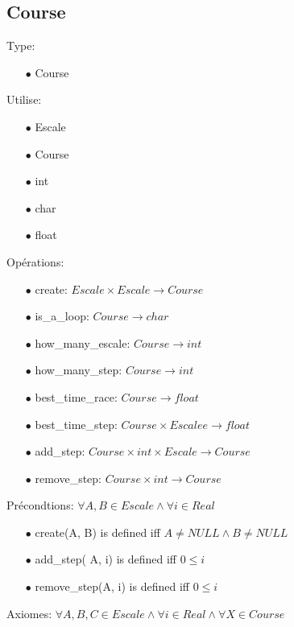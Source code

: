 \documentclass[a4paper, 11pt, oneside]{article}
\begin{document}
\subsection{Course}

\noindent Type: 
    \begin{itemize}
        \item[$\bullet$] Course
    \end{itemize}
    Utilise: 
    \begin{itemize}
        \item[$\bullet$] Escale
        \item[$\bullet$] Course
        \item[$\bullet$] int
        \item[$\bullet$] char
        \item[$\bullet$] float
    \end{itemize}
    Opérations: 
    \begin{itemize}
        \item[$\bullet$] create: $Escale \times Escale \rightarrow Course$
        \item[$\bullet$] is\_a\_loop: $Course \rightarrow char$
        \item[$\bullet$] how\_many\_escale: $Course \rightarrow int$
        \item[$\bullet$] how\_many\_step: $Course \rightarrow int$
        \item[$\bullet$] best\_time\_race: $Course \rightarrow float$
        \item[$\bullet$] best\_time\_step: $Course \times Escalee \rightarrow float$
        \item[$\bullet$] add\_step: $Course \times int \times Escale \rightarrow Course$
        \item[$\bullet$] remove\_step: $Course \times int \rightarrow Course$
    \end{itemize}
    Précondtions:
        $\forall A, B \in Escale \land \forall i \in Real$ 
        \begin{itemize}
            \item[$\bullet$] create(A, B) is defined iff $A \ne NULL \land B \ne NULL$
            \item[$\bullet$] add\_step( A, i) is defined iff $0 \leq i$
            \item[$\bullet$] remove\_step(A, i) is defined iff $0 \leq i$ 
        \end{itemize}
    Axiomes: $\forall A, B, C \in Escale \land \forall i \in Real\land \forall X \in Course$
\end{document}
